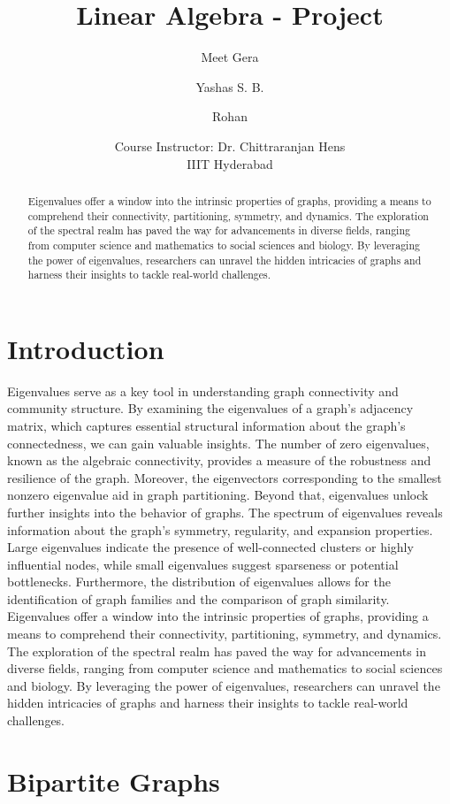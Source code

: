 \documentclass{article}
\title{Linear Algebra - Project}
\author{Meet Gera \and Yashas S. B. \and Rohan}
\date{Course Instructor: Dr. Chittraranjan Hens \\  IIIT Hyderabad}
\begin{document}
\maketitle

\begin{abstract}
Eigenvalues offer a window into the intrinsic properties of graphs, providing a means to comprehend their connectivity, partitioning, symmetry, and dynamics. The exploration of the spectral realm has paved the way for advancements in diverse fields, ranging from computer science and mathematics to social sciences and biology. By leveraging the power of eigenvalues, researchers can unravel the hidden intricacies of graphs and harness their insights to tackle real-world challenges.
\end{abstract}

\section{Introduction}
Eigenvalues serve as a key tool in understanding graph connectivity and community structure. By examining the eigenvalues of a graph's adjacency matrix, which captures essential structural information about the graph's connectedness, we can gain valuable insights. The number of zero eigenvalues, known as the algebraic connectivity, provides a measure of the robustness and resilience of the graph. Moreover, the eigenvectors corresponding to the smallest nonzero eigenvalue aid in graph partitioning. Beyond that, eigenvalues unlock further insights into the behavior of graphs. The spectrum of eigenvalues reveals information about the graph's symmetry, regularity, and expansion properties. Large eigenvalues indicate the presence of well-connected clusters or highly influential nodes, while small eigenvalues suggest sparseness or potential bottlenecks. Furthermore, the distribution of eigenvalues allows for the identification of graph families and the comparison of graph similarity. Eigenvalues offer a window into the intrinsic properties of graphs, providing a means to comprehend their connectivity, partitioning, symmetry, and dynamics. The exploration of the spectral realm has paved the way for advancements in diverse fields, ranging from computer science and mathematics to social sciences and biology. By leveraging the power of eigenvalues, researchers can unravel the hidden intricacies of graphs and harness their insights to tackle real-world challenges.

\section{Bipartite Graphs}
\end{document}
